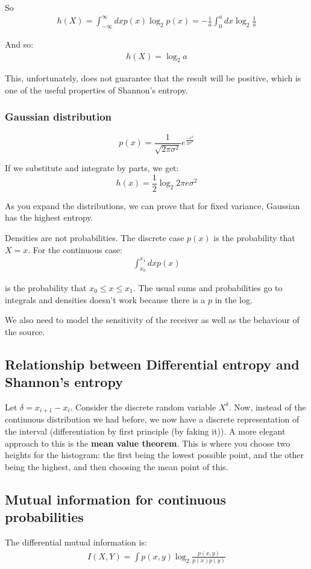 \documentclass[11pt,a4paper,titlepage,dvipsnames,cmyk]{scrartcl}
\begin{document}
So
\begin{align*}
h(X) = \int_{-\infty}^{\infty} dx p(x) \log_2 p(x) = - \frac{1}{a}\int_{0}^{a}dx \log_2 \frac{1}{a}
\end{align*}

And so:
\begin{align*}
h(X) = \log_2 a
\end{align*}

This, unfortunately, does not guarantee that the result will be positive, which is one of the useful properties of Shannon's entropy.

\subsubsection{Gaussian distribution}
$$p(x) = \frac{1}{\sqrt{2 \pi \sigma^2}}e^{\frac{-x^2}{2\sigma^2}}$$

If we substitute and integrate by parts, we get:
$$h(x) = \frac{1}{2} \log_2 2 \pi e \sigma ^2$$

As you expand the distributions, we can prove that for fixed variance, Gaussian has the highest entropy.

Densities are not probabilities. The discrete case $p(x)$ is the probability that $X = x$. For the continuous case:
\begin{align*}
\int_{x_0}^{x_1} dx p(x)
\end{align*}

is the probability that $x_0 \le x \le x_1$. The usual sums and probabilities go to integrals and densities doesn't work because there is a $p$ in the log.

We also need to model the sensitivity of the receiver as well as the behaviour of the source.

\subsection{Relationship between Differential entropy and Shannon's entropy}
Let $\delta = x_{i+1} - x_i$. Consider the discrete random variable $X^\delta$. Now, instead of the continuous distribution we had before, we now have a discrete representation of the interval (differentiation by first principle (by faking it)). A more elegant approach to this is the \textbf{mean value theorem}. This is where you choose two heights for the histogram: the first being the lowest possible point, and the other being the highest, and then choosing the mean point of this.

\subsection{Mutual information for continuous probabilities}
The differential mutual information is:
\begin{align*}
I(X,Y) = \int p(x,y) \log_2 \frac{p(x,y)}{p(x)p(y)}
\end{align*}
\end{document}
